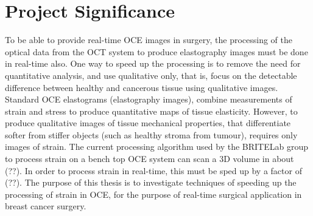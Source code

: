 \section{Project Significance}
To be able to provide real-time OCE images in surgery, the processing of the optical data from the OCT system to produce elastography images must be done in real-time also. One way to speed up the processing is to remove the need for quantitative analysis, and use qualitative only, that is, focus on the detectable difference between healthy and cancerous tissue using qualitative images. Standard OCE elastograms (elastography images), combine measurements of strain and stress to produce quantitative maps of tissue elasticity. However, to produce qualitative images of tissue mechanical properties, that differentiate softer from stiffer objects (such as healthy stroma from tumour), requires only images of strain. 
The current processing algorithm used by the BRITELab group to process strain on a bench top OCE system can scan a 3D volume in about (??). In order to process strain in real-time, this must be sped up by a factor of (??). The purpose of this thesis is to investigate techniques of speeding up the processing of strain in OCE, for the purpose of real-time surgical application in breast cancer surgery.
